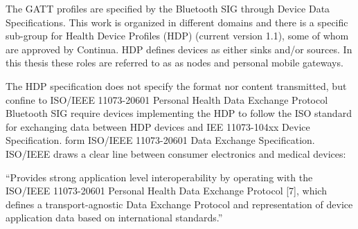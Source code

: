 The GATT profiles are specified by the Bluetooth SIG through Device Data Specifications. This work is organized in different domains and there is a specific sub-group for Health Device Profiles (HDP) (current version 1.1), some of whom are approved by Continua. HDP defines devices as either sinks and/or sources. In this thesis these roles are referred to as as nodes and personal mobile gateways.

The HDP specification does not specify the format nor content transmitted, but confine to ISO/IEEE 11073-20601 Personal Health Data Exchange Protocol \cite{newRef:18} Bluetooth SIG require devices implementing the HDP to follow the ISO standard for exchanging data between HDP devices and IEE 11073-104xx Device Specification. form ISO/IEEE 11073-20601 Data Exchange Specification. ISO/IEEE draws a clear line between consumer electronics and medical devices: 

``Provides strong application level interoperability by operating with the ISO/IEEE 11073-20601 Personal Health Data Exchange Protocol [7], which defines a transport-agnostic Data Exchange Protocol and representation of device application data based on international standards.''





